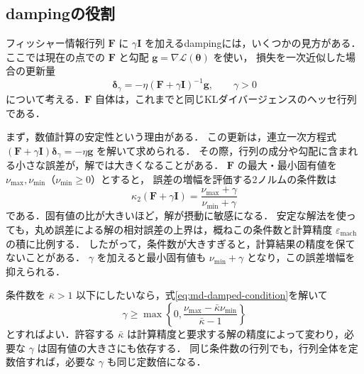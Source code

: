\documentclass[../main.tex]{subfiles}
\begin{document}
\subsection{dampingの役割}
\label{subsec:md-damping}

フィッシャー情報行列 $\bm{F}$ に $\gamma\bm{I}$ を加えるdampingには，いくつかの見方がある．
ここでは現在の点での $\bm{F}$ と勾配 $\bm{g}=\nabla\mathcal{L}(\bm{\theta})$ を使い，
損失を一次近似した場合の更新量
\begin{equation}
  \bm{\delta}_\gamma=-\eta(\bm{F}+\gamma\bm{I})^{-1}\bm{g},
  \qquad\gamma>0
  \label{eq:md-damped-update}
\end{equation}
について考える．$\bm{F}$ 自体は，これまでと同じKLダイバージェンスのヘッセ行列である．

まず，数値計算の安定性という理由がある．
この更新は，連立一次方程式 $(\bm{F}+\gamma\bm{I})\bm{\delta}_\gamma=-\eta\bm{g}$ を解いて求められる．
その際，行列の成分や勾配に含まれる小さな誤差が，解では大きくなることがある．
$\bm{F}$ の最大・最小固有値を $\nu_{\max},\nu_{\min}$（$\nu_{\min}\geq0$）とすると，
誤差の増幅を評価する2ノルムの条件数は
\begin{equation}
  \kappa_2(\bm{F}+\gamma\bm{I})
  =\frac{\nu_{\max}+\gamma}{\nu_{\min}+\gamma}
  \label{eq:md-damped-condition}
\end{equation}
である．固有値の比が大きいほど，解が摂動に敏感になる．
安定な解法を使っても，丸め誤差による解の相対誤差の上界は，概ねこの条件数と計算精度 $\varepsilon_{\mathrm{mach}}$ の積に比例する\cite{intel2026error}．
したがって，条件数が大きすぎると，計算結果の精度を保てないことがある．
$\gamma$ を加えると最小固有値も $\nu_{\min}+\gamma$ となり，この誤差増幅を抑えられる．

条件数を $\bar\kappa>1$ 以下にしたいなら，式\eqref{eq:md-damped-condition}を解いて
\begin{equation}
  \gamma\geq\max\left\{0,
  \frac{\nu_{\max}-\bar\kappa\nu_{\min}}{\bar\kappa-1}\right\}
  \label{eq:md-damping-threshold}
\end{equation}
とすればよい．許容する $\bar\kappa$ は計算精度と要求する解の精度によって変わり，必要な $\gamma$ は固有値の大きさにも依存する．
同じ条件数の行列でも，行列全体を定数倍すれば，必要な $\gamma$ も同じ定数倍になる．
\end{document}
